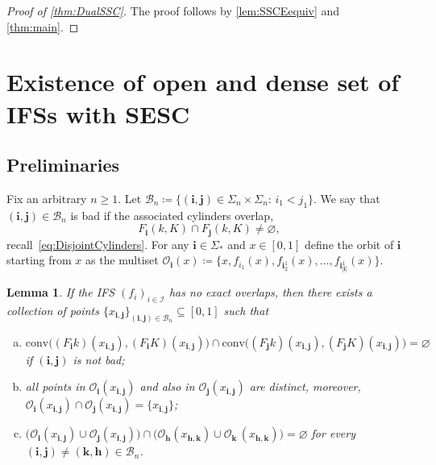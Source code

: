 \documentclass[11pt,]{article}
\def\cref#1{\ref{#1}}%
\newtheorem{lemma}[theorem]{Lemma}
\theoremstyle{definition}
\theoremstyle{remark}
\newcommand{\0}{\mathbf{0}}
\newcommand{\bi}{\mathbf{i}}
\newcommand{\bj}{\mathbf{j}}
\newcommand{\bk}{{\mathbf{k}}}
\newcommand{\bh}{{\mathbf{h}}}
\begin{document}
\begin{proof}[Proof of \cref{thm:DualSSC}]
	The proof follows by \cref{lem:SSCEequiv} and \cref{thm:main}.
\end{proof}

\section{Existence of open and dense set of IFSs with SESC}\label{sec:ProofESCOpenDense}

\subsection{Preliminaries}

Fix an arbitrary $n\geq 1$. Let $\mathcal{B}_n\coloneqq\{(\bi,\bj)\in\Sigma_n\times\Sigma_n:\,
i_1<j_1\}$. We say that $(\bi,\bj)\in\mathcal{B}_n$ is bad if the associated cylinders overlap,
\begin{equation}\label{eq:DefBad}
F_{\bi}(k,K)\cap F_{\bj}(k,K)\neq\varnothing,
\end{equation}
recall~\cref{eq:DisjointCylinders}. For any $\bi\in\Sigma_*$ and $x\in[0,1]$ define the orbit of
$\bi$ starting from $x$ as the multiset $\mathcal{O}_{\bi}(x)\coloneqq \{x,f_{i_1}(x),
f_{\bi_2^1}(x),\ldots,f_{\bi_{|\bi|}^1}(x)\}$. 


\begin{lemma}\label{lem:Pointsx_ij}
If the IFS $(f_i)_{i\in\mathcal{I}}$ has no exact overlaps, then there exists a collection of points
$\{x_{\bi,\bj}\}_{(\bi,\bj)\in\mathcal{B}_n}\subseteq[0,1]$ such that
\begin{enumerate}[(a)]
\item $\mathrm{conv}\big((F_{\bi}k)(x_{\bi,\bj}), (F_{\bi}K)(x_{\bi,\bj})\big) \cap
  \mathrm{conv}\big((F_{\bj}k)(x_{\bi,\bj}),
	(F_{\bj}K)(x_{\bi,\bj})\big)= \varnothing$ if $(\bi,\bj)$ is not bad;  
\item all points in $\mathcal{O}_{\bi}(x_{\bi,\bj})$ and also in $\mathcal{O}_{\bj}(x_{\bi,\bj})$
  are distinct, moreover,
  $\mathcal{O}_{\bi}(x_{\bi,\bj})\cap\mathcal{O}_{\bj}(x_{\bi,\bj})=\{x_{\bi,\bj}\}$;
\item $\big(\mathcal{O}_{\bi}(x_{\bi,\bj})\cup \mathcal{O}_{\bj}(x_{\bi,\bj})\big) \cap
  \big(\mathcal{O}_{\bh}(x_{\bh,\bk})\cup
  \mathcal{O}_{\bk}\,(x_{\bh,\bk})\big)=\varnothing$ for every $(\bi,\bj)\neq
  (\bk,\bh)\in\mathcal{B}_n$.
\end{enumerate} 
\end{lemma}
\end{document}
